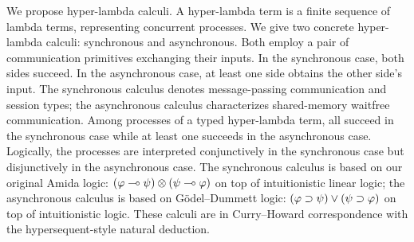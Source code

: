 \begin{eabstract}
 We propose hyper-lambda calculi.  A hyper-lambda term is a finite
 sequence of lambda terms, representing concurrent processes.  We give
 two concrete hyper-lambda calculi: synchronous and asynchronous.  Both
 employ a
 pair of communication primitives exchanging their inputs.
 In the synchronous case, both sides succeed.  In the asynchronous case,
 at least one side obtains the other side's input.
 The synchronous calculus denotes message-passing communication
 and session types;
 the asynchronous calculus characterizes shared-memory waitfree
 communication.
 Among processes of a typed hyper-lambda term,
 all succeed in the synchronous case while
 at least one succeeds in the asynchronous case.
 Logically, the processes are interpreted conjunctively
 in the synchronous case but disjunctively in the asynchronous case.
 The synchronous calculus is based on our original Amida logic:
 $(\varphi\multimap\psi)\otimes(\psi\multimap\varphi)$ on top of intuitionistic linear
 logic;
 the asynchronous calculus is based on G\"odel--Dummett logic:
 $(\varphi\supset\psi)\lor(\psi\supset\varphi)$ on top of intuitionistic logic.
 These calculi are in Curry--Howard correspondence with the
 hypersequent-style natural deduction.
\end{eabstract}

